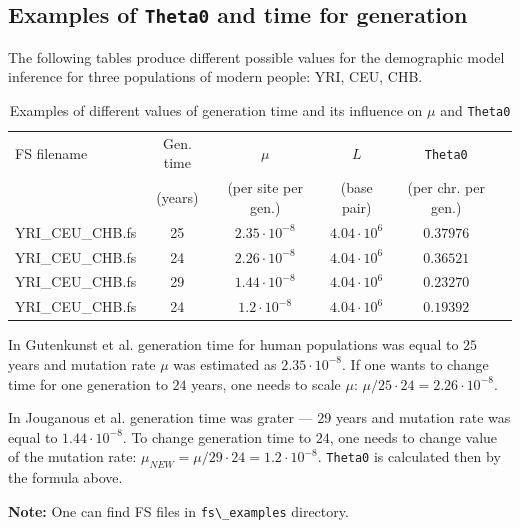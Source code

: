 \documentclass[12pt]{article}
\makeatletter
\newcommand{\py}[1]{\lstinline[language=Python, showstringspaces=False]@#1@}
\makeatother
\begin{document}
\subsection{Examples of \py{Theta0} and time for generation}
The following tables produce different possible values for the demographic model inference for three populations of modern people: YRI, CEU, CHB.
\begin{table}[h]
    \centering
    \begin{tabular}{|l|c|c|c|c|l|}
        \hline
        FS filename	        & Gen. time  &	$\mu$	   &      $L$	   & \py{Theta0} \\
                            & (years)   & (per site per gen.)  & (base pair) & (per chr. per gen.)\\
        \hline
        YRI\_CEU\_CHB.fs	& 25 \cite{gutenkunst2009}   & $2.35 \cdot 10^{-8}$ \cite{gutenkunst2009} & $4.04 \cdot 10^6$ \cite{gutenkunst2009} & $0.37976$ \\
        YRI\_CEU\_CHB.fs	& 24 \cite{lapierre2017accuracy} & $2.26 \cdot 10^{-8}$ \cite{gutenkunst2009} & $4.04 \cdot 10^6$ \cite{gutenkunst2009} & $0.36521$ \\
        YRI\_CEU\_CHB.fs	& 29 \cite{Jouganous1549}	& $1.44 \cdot 10^{-8}$ \cite{Jouganous1549} & $4.04 \cdot 10^6$ \cite{gutenkunst2009} & $0.23270$ \\
        YRI\_CEU\_CHB.fs	& 24 \cite{lapierre2017accuracy} & $1.2 \cdot 10^{-8}$ \cite{Jouganous1549}  & $4.04 \cdot 10^6$ \cite{gutenkunst2009} & $0.19392$  \\
        \hline
    \end{tabular}
    \caption{Examples of different values of generation time and its influence on $\mu$ and \py{Theta0}}
    \label{tab:my_label}
\end{table}

In Gutenkunst et al. \cite{gutenkunst2009} generation time for human populations was equal to $25$ years and mutation rate $\mu$ was estimated as $2.35 \cdot 10^{-8}$. If one wants to change time for one generation to $24$ years, one needs to scale $\mu$: $\mu / 25 \cdot 24 = 2.26 \cdot 10^{-8}$.

In Jouganous et al. \cite{Jouganous1549} generation time was grater --- $29$ years and mutation rate was equal to $1.44 \cdot 10^{-8}$. To change generation time to $24$, one needs to change value of the mutation rate: $\mu_{NEW} = \mu / 29 \cdot 24 = 1.2 \cdot 10^{-8}$. \py{Theta0} is calculated then by the formula above.

\textbf{Note:} One can find FS files in \py{fs\_examples} directory.
\end{document}
